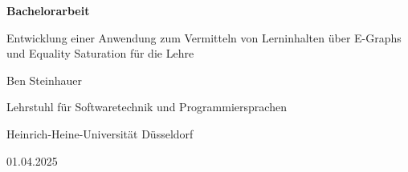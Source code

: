 \begin{frame}
    \thispagestyle{empty}
    \centering

    {\bf\color{black} Bachelorarbeit}\vspace{4mm}

    {\color{hhuUniBlau}\large Entwicklung einer Anwendung zum Vermitteln von Lerninhalten über E-Graphs und Equality Saturation für die Lehre}\vspace{4mm}

    {\color{hhuUniBlau} Ben Steinhauer}\vspace{3mm}

    {\footnotesize Lehrstuhl für Softwaretechnik und Programmiersprachen}\vspace{-1mm}

    {\footnotesize Heinrich-Heine-Universität Düsseldorf}\vspace{4mm}

    {\footnotesize 01.04.2025}

\end{frame}